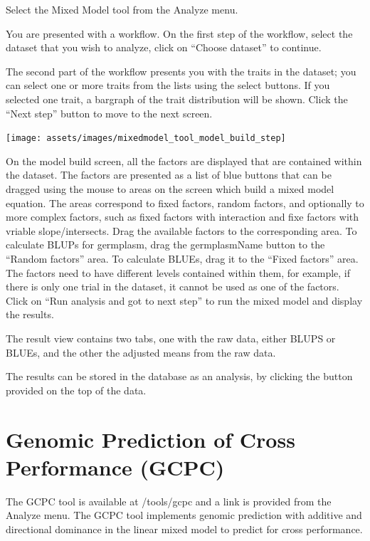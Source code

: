 \documentclass[
  12pt,
]{book}
\begin{document}
Select the Mixed Model tool from the Analyze menu.

You are presented with a workflow. On the first step of the workflow, select the dataset that you wish to analyze, click on ``Choose dataset'' to continue.

The second part of the workflow presents you with the traits in the dataset; you can select one or more traits from the lists using the select buttons. If you selected one trait, a bargraph of the trait distribution will be shown. Click the ``Next step'' button to move to the next screen.

\begin{center}\texttt{[image: assets/images/mixedmodel\_tool\_model\_build\_step]} \end{center}

On the model build screen, all the factors are displayed that are contained within the dataset. The factors are presented as a list of blue buttons that can be dragged using the mouse to areas on the screen which build a mixed model equation. The areas correspond to fixed factors, random factors, and optionally to more complex factors, such as fixed factors with interaction and fixe factors with vriable slope/intersects. Drag the available factors to the corresponding area. To calculate BLUPs for germplasm, drag the germplasmName button to the ``Random factors'' area. To calculate BLUEs, drag it to the ``Fixed factors'' area. The factors need to have different levels contained within them, for example, if there is only one trial in the dataset, it cannot be used as one of the factors. Click on ``Run analysis and got to next step'' to run the mixed model and display the results.

The result view contains two tabs, one with the raw data, either BLUPS or BLUEs, and the other the adjusted means from the raw data.

The results can be stored in the database as an analysis, by clicking the button provided on the top of the data.

\hypertarget{genomic-prediction-of-cross-performance-gcpc}{%
\section{Genomic Prediction of Cross Performance (GCPC)}\label{genomic-prediction-of-cross-performance-gcpc}}

The GCPC tool is available at /tools/gcpc and a link is provided from the Analyze menu. The GCPC tool implements genomic prediction with additive and directional dominance in the linear mixed model to predict for cross performance.
\end{document}
